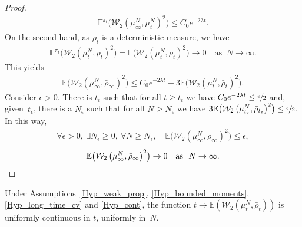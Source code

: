 \begin{proof}
\begin{align*}
\mathbb{E}^{\pi_t}\bigl(\mathcal{W}_2\left(\mu^N_{\infty},\mu^N_{t}\right)^2\bigr)\leq C_0e^{-2\lambda t}.
\end{align*}
On the second hand, as $\bar{\rho}_{t}$ is a deterministic measure, we have
\begin{align*}
\mathbb{E}^{\pi_t}\bigl(\mathcal{W}_2\left(\mu^N_{t},\bar{\rho}_{t}\right)^2\bigr)=\mathbb{E}\bigl(\mathcal{W}_2\left(\mu^N_{t},\bar{\rho}_{t}\right)^2\bigr)\to 0\quad\text{as }\ N\to\infty.
\end{align*}
This yields
\begin{align*}
\mathbb{E}\bigl(\mathcal{W}_2\left(\mu^N_{\infty},\bar{\rho}_{\infty}\right)^2\bigr)\leq C_0e^{-2\lambda t}+3\mathbb{E}\bigl(\mathcal{W}_2\left(\mu^N_{t},\bar{\rho}_{t}\right)^2\bigr).
\end{align*}
Consider $\epsilon>0$. There is $t_\epsilon$ such that for all $t\geq t_\epsilon$ we have $C_0e^{-2\lambda t}\leq\sfrac{\epsilon}{2}$ and, given~$t_\epsilon$, there is a $N_\epsilon$ such that for all $N\geq N_\epsilon$ we have ${3\mathbb{E}\bigl(\mathcal{W}_2\left(\mu^{N}_{t_\epsilon},\bar{\rho}_{t_\epsilon} \right)^2 \bigr)\leq\sfrac{\epsilon}{2}}$. In this way,
\begin{align*}
\forall \epsilon >0,\ \exists N_\epsilon \geq0,\ \forall N\geq N_\epsilon,\quad \mathbb{E}\bigl(\mathcal{W}_2\left(\mu^N_{\infty},\bar{\rho}_{\infty} \right)^2 \bigr)\leq\epsilon,
\end{align*}
\ie
\[
\mathbb{E}\bigl(\mathcal{W}_2\left(\mu^N_{\infty},\bar{\rho}_{\infty}\right)^2\bigr)\to 0\quad\text{as }\ N\to\infty.\qedhere
\]
\end{proof}

\begin{lemma}\label{cont_unif}
Under Assumptions~\ref{Hyp_weak_prop}, \ref{Hyp_bounded_moments}, \ref{Hyp_long_time_cv} and \ref{Hyp_cont}, the function $t\!\to\!\mathbb{E}\left(\mathcal{W}_2\left(\mu^N_{t},\bar{\rho}_{t}\right)\right)$ is uniformly continuous in $t$, uniformly in~$N$.
\end{lemma}

